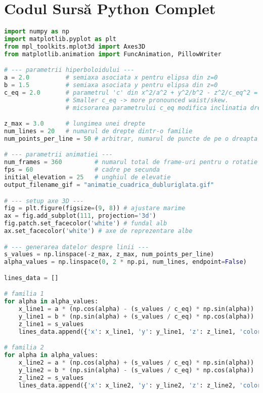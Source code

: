 \documentclass[a4paper,11pt]{article}
\begin{document}
\section{Codul Sursă Python Complet}
\begin{lstlisting}[language=Python, caption=Script Python pentru animația cuadricei dublu riglate, label=lst:python_code]
import numpy as np
import matplotlib.pyplot as plt
from mpl_toolkits.mplot3d import Axes3D
from matplotlib.animation import FuncAnimation, PillowWriter

# --- parametrii hiperboloidului ---
a = 2.0          # semiaxa asociata x pentru elipsa din z=0
b = 1.5          # semiaxa asociata y pentru elipsa din z=0
c_eq = 2.0       # parametrul 'c' din x^2/a^2 + y^2/b^2 - z^2/c_eq^2 = 1
                 # Smaller c_eq -> more pronounced waist/skew.
                 # micsorarea parametrului c_eq modifica inclinatia dreptelor

z_max = 3.0      # lungimea unei drepte
num_lines = 20   # numarul de drepte dintr-o familie
num_points_per_line = 50 # arbitrar, numarul de puncte de pe o dreapta

# --- parametrii animatiei ---
num_frames = 360         # numarul total de frame-uri pentru o rotatie completa
fps = 60                 # cadre pe secunda
initial_elevation = 25   # unghiul de elevatie
output_filename_gif = "animatie_cuadrica_dubluriglata.gif"

# --- setup axe 3D ---
fig = plt.figure(figsize=(9, 8)) # ajustare marime
ax = fig.add_subplot(111, projection='3d')
fig.patch.set_facecolor('white') # fundal alb
ax.set_facecolor('white') # axe de reprezentare albe

# --- generarea datelor despre linii ---
s_values = np.linspace(-z_max, z_max, num_points_per_line)
alpha_values = np.linspace(0, 2 * np.pi, num_lines, endpoint=False)

lines_data = []

# familia 1
for alpha in alpha_values:
    x_line1 = a * (np.cos(alpha) - (s_values / c_eq) * np.sin(alpha))
    y_line1 = b * (np.sin(alpha) + (s_values / c_eq) * np.cos(alpha))
    z_line1 = s_values
    lines_data.append({'x': x_line1, 'y': y_line1, 'z': z_line1, 'color': 'blue', 'linewidth': 1.2})

# familia 2
for alpha in alpha_values:
    x_line2 = a * (np.cos(alpha) + (s_values / c_eq) * np.sin(alpha))
    y_line2 = b * (np.sin(alpha) - (s_values / c_eq) * np.cos(alpha))
    z_line2 = s_values
    lines_data.append({'x': x_line2, 'y': y_line2, 'z': z_line2, 'color': 'red', 'linewidth': 1.2})


\end{lstlisting}
\end{document}
